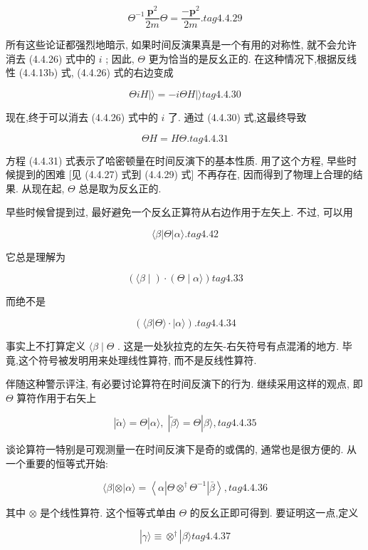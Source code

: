 $$
{\Theta }^{-1}\frac{{\mathbf{p}}^{2}}{2m}\Theta = \frac{-{\mathbf{p}}^{2}}{2m}. tag{4. 4.29}
$$

所有这些论证都强烈地暗示, 如果时间反演果真是一个有用的对称性, 就不会允许消去 (4.4.26) 式中的 $i$ ; 因此, $\Theta$ 更为恰当的是反幺正的. 在这种情况下,根据反线性 (4.4.13b) 式, (4.4.26) 式的右边变成

$$
{\Theta iH}\left| {\rangle = - {i\Theta H}}\right| \rangle tag{4. 4.30}
$$

现在,终于可以消去 (4.4.26) 式中的 $i$ 了. 通过 (4.4.30) 式,这最终导致

$$
{\Theta H} = {H\Theta }. tag{4. 4.31}
$$

方程 (4.4.31) 式表示了哈密顿量在时间反演下的基本性质. 用了这个方程, 早些时候提到的困难 [见 (4.4.27) 式到 (4.4.29) 式] 不再存在, 因而得到了物理上合理的结果. 从现在起, $\Theta$ 总是取为反幺正的.

早些时候曾提到过, 最好避免一个反幺正算符从右边作用于左矢上. 不过, 可以用

$$
\langle \beta \left| \Theta \right| \alpha \rangle \text{.} tag{4. 42}
$$

它总是理解为

$$
\left( {\langle \beta \mid }\right) \cdot \left( {\Theta \mid \alpha \rangle }\right) tag{4. 3 3}
$$

而绝不是

$$
\left( {\langle \beta \left| {\Theta \rangle \cdot }\right| \alpha \rangle }\right) \text{.} tag{4. 4.34}
$$

事实上不打算定义 $\langle \beta \mid \Theta$ . 这是一处狄拉克的左矢-右矢符号有点混淆的地方. 毕竟,这个符号被发明用来处理线性算符, 而不是反线性算符.

伴随这种警示评注, 有必要讨论算符在时间反演下的行为. 继续采用这样的观点, 即 $\Theta$ 算符作用于右矢上

$$
\left| {\widetilde{\alpha }\rangle = \Theta }\right| \alpha \rangle ,\;\left| {\widetilde{\beta }\rangle = \Theta }\right| \beta \rangle , tag{4. 4.35}
$$

谈论算符一特别是可观测量一在时间反演下是奇的或偶的, 通常也是很方便的. 从一个重要的恒等式开始:

$$
\langle \beta \left| \otimes \right| \alpha \rangle = \left\langle {\alpha \left| {\Theta { \otimes }^{ \dagger }{\Theta }^{-1}}\right| \bar{\beta }}\right\rangle , tag{4. 4.36}
$$

其中 $\otimes$ 是个线性算符. 这个恒等式单由 $\Theta$ 的反幺正即可得到. 要证明这一点,定义

$$
\left| {\gamma \rangle \equiv { \otimes }^{ \dagger }}\right| \beta \rangle tag{4. 4.37}
$$

